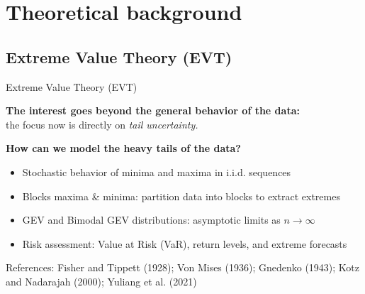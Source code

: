 \section{Theoretical background}

\subsection{Extreme Value Theory (EVT)}
\begin{frame}{Extreme Value Theory (EVT)}

\small
\textbf{The interest goes beyond the general behavior of the data:} \\
the focus now is directly on \textit{tail uncertainty.}


\vspace{1cm}

\textbf{How can we model the heavy tails of the data?}

\begin{itemize}
  \item Stochastic behavior of minima and maxima in i.i.d. sequences
  \item Blocks maxima \& minima: partition data into blocks to extract extremes
  \item GEV and Bimodal GEV distributions: asymptotic limits as $n \to \infty$
  \item Risk assessment: Value at Risk (VaR), return levels, and extreme forecasts
\end{itemize}


\vfill
\begin{flushright}
{\tiny References: Fisher and Tippett (1928);  Von Mises (1936); Gnedenko (1943); Kotz and Nadarajah (2000); Yuliang et al. (2021)}
\end{flushright}
\end{frame}




